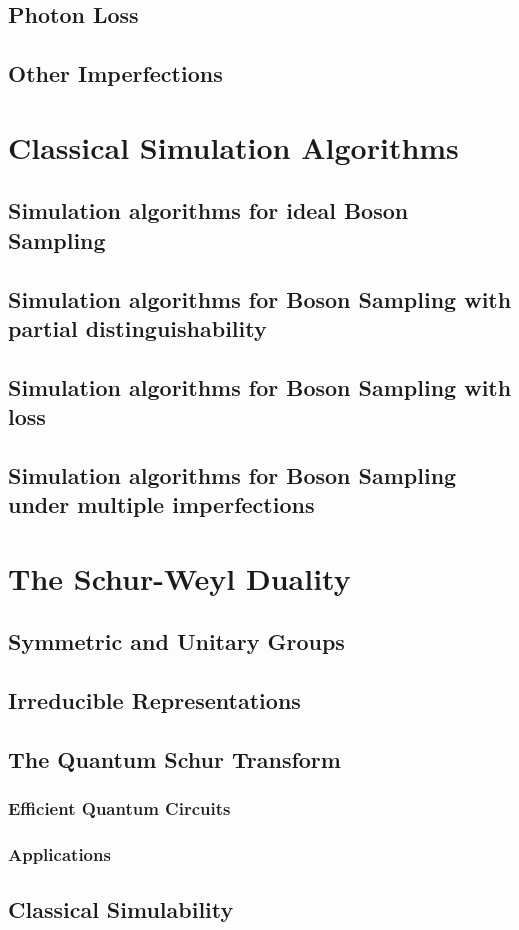 \subsection{Photon Loss}

\subsection{Other Imperfections}

\section{Classical Simulation Algorithms}

\subsection{Simulation algorithms for ideal Boson Sampling}

\subsection{Simulation algorithms for Boson Sampling with partial distinguishability}

\subsection{Simulation algorithms for Boson Sampling with loss}

\subsection{Simulation algorithms for Boson Sampling under multiple imperfections}

\section{The Schur-Weyl Duality}

\subsection{Symmetric and Unitary Groups}

\subsection{Irreducible Representations}

\subsection{The Quantum Schur Transform}

\subsubsection{Efficient Quantum Circuits}

\subsubsection{Applications}

\subsection{Classical Simulability}
